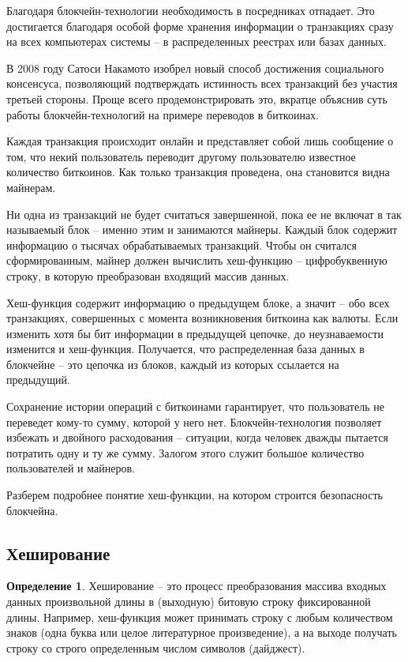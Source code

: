 \documentclass[och, master, pract]{SCWorks_fix}
\theoremstyle{plain}
\theoremstyle{plain}
\theoremstyle{plain}
\theoremstyle{definition}
\newtheorem{defn}{Определение}
\begin{document}
Благодаря блокчейн-технологии необходимость в посредниках отпадает. Это достигается благодаря особой форме хранения информации о транзакциях сразу на всех компьютерах системы – в распределенных реестрах или базах данных.

В 2008 году Сатоси Накамото изобрел новый способ достижения социального консенсуса, позволяющий подтверждать истинность всех транзакций без участия третьей стороны. Проще всего продемонстрировать это, вкратце объяснив суть работы блокчейн-технологий на примере переводов в биткоинах.

Каждая транзакция происходит онлайн и представляет собой лишь сообщение о том, что некий пользователь переводит другому пользователю известное количество биткоинов. Как только транзакция проведена, она становится видна майнерам.

Ни одна из транзакций не будет считаться завершенной, пока ее не включат в так называемый блок – именно этим и занимаются майнеры. Каждый блок содержит информацию о тысячах обрабатываемых транзакций. Чтобы он считался сформированным, майнер должен вычислить хеш-функцию – цифробуквенную строку, в которую преобразован входящий массив данных.

Хеш-функция содержит информацию о предыдущем блоке, а значит – обо всех транзакциях, совершенных с момента возникновения биткоина как валюты. Если изменить хотя бы бит информации в предыдущей цепочке, до неузнаваемости изменится и хеш-функция. Получается, что распределенная база данных в блокчейне – это цепочка из блоков, каждый из которых ссылается на предыдущий.

Сохранение истории операций с биткоинами гарантирует, что пользователь не переведет кому-то сумму, которой у него нет. Блокчейн-технология позволяет избежать и двойного расходования – ситуации, когда человек дважды пытается потратить одну и ту же сумму. Залогом этого служит большое количество пользователей и майнеров.

Разберем подробнее понятие хеш-функции, на котором строится безопасность блокчейна.

\subsection{Хеширование}
\begin{defn}
Хеширование – это процесс преобразования массива входных данных произвольной длины в (выходную) битовую строку фиксированной длины. Например, хеш-функция может принимать строку с любым количеством знаков (одна буква или целое литературное произведение), а на выходе получать строку со строго определенным числом символов (дайджест).
\end{defn}
\end{document}
